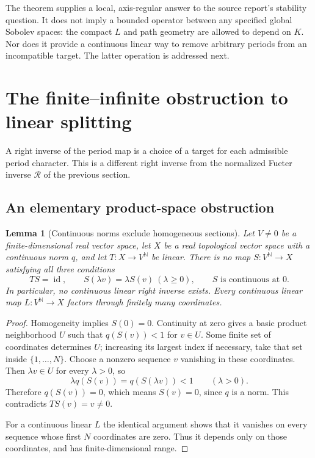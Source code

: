 \documentclass[11pt,a4paper]{article}
\numberwithin{equation}{section}
\newtheorem{lemma}[theorem]{Lemma}
\theoremstyle{definition}
\theoremstyle{remark}
\newcommand{\N}{\mathbb N}
\newcommand{\id}{\operatorname{id}}
\begin{document}
The theorem supplies a local, axis-regular answer to the source report's
stability question. It does not imply a bounded operator between any specified
global Sobolev spaces: the compact $L$ and path geometry are allowed to depend
on $K$. Nor does it provide a continuous linear way to remove arbitrary
periods from an incompatible target. The latter operation is addressed next.

\section{The finite--infinite obstruction to linear splitting}
\label{sec:nonsplit}

A right inverse of the period map is a choice of a target for each admissible
period character. This is a different right inverse from the normalized
Fueter inverse $\mathcal R$ of the previous section.

\subsection{An elementary product-space obstruction}

\begin{lemma}[Continuous norms exclude homogeneous sections]
\label{lem:no-section}
Let $V\ne0$ be a finite-dimensional real vector space, let $X$ be a real
topological vector space with a continuous norm $q$, and let
$T:X\to V^\N$ be linear. There is no map $S:V^\N\to X$ satisfying all three
conditions
\[
 TS=\id,\qquad S(\lambda v)=\lambda S(v)\ (\lambda\ge0),
 \qquad S\text{ is continuous at }0.
\]
In particular, no continuous linear right inverse exists. Every continuous
linear map $L:V^\N\to X$ factors through finitely many coordinates.
\end{lemma}
\begin{proof}
Homogeneity implies $S(0)=0$. Continuity at zero gives a basic product
neighborhood $U$ such that $q(S(v))<1$ for $v\in U$. Some finite set of
coordinates determines $U$; increasing its largest index if necessary, take
that set inside $\{1,\ldots,N\}$. Choose a nonzero sequence $v$ vanishing in
these coordinates. Then $\lambda v\in U$ for every $\lambda>0$, so
\[
 \lambda q(S(v))=q(S(\lambda v))<1\qquad(\lambda>0).
\]
Therefore $q(S(v))=0$, which means $S(v)=0$, since $q$ is a norm. This
contradicts $TS(v)=v\ne0$.

For a continuous linear $L$ the identical argument shows that it vanishes
on every sequence whose first $N$ coordinates are zero. Thus it depends only
on those coordinates, and has finite-dimensional range.
\end{proof}
\end{document}
